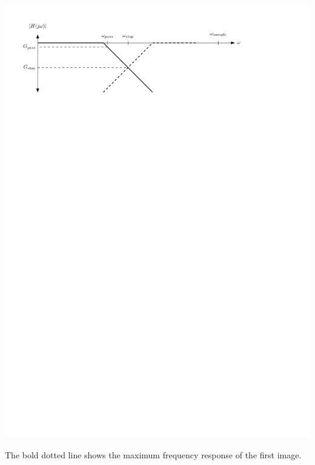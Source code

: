 \begin{center}
  \includegraphics[scale=1]{graphics/antialias.pdf}
\end{center}
The bold dotted line shows the maximum frequency response of the first image.  
